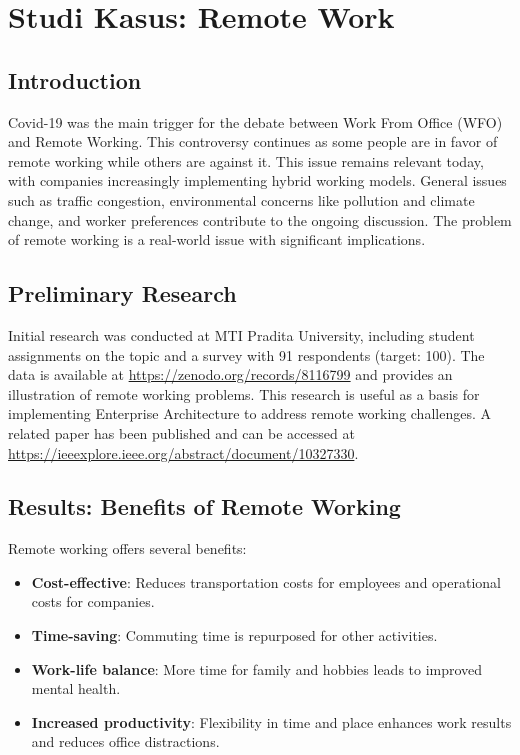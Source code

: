 \chapter{Studi Kasus: Remote Work}

\section{Introduction}

Covid-19 was the main trigger for the debate between Work From Office (WFO) and Remote Working. This controversy continues as some people are in favor of remote working while others are against it. This issue remains relevant today, with companies increasingly implementing hybrid working models. General issues such as traffic congestion, environmental concerns like pollution and climate change, and worker preferences contribute to the ongoing discussion. The problem of remote working is a real-world issue with significant implications.

\section{Preliminary Research}

Initial research was conducted at MTI Pradita University, including student assignments on the topic and a survey with 91 respondents (target: 100). The data is available at \url{https://zenodo.org/records/8116799} and provides an illustration of remote working problems. This research is useful as a basis for implementing Enterprise Architecture to address remote working challenges. A related paper has been published and can be accessed at \url{https://ieeexplore.ieee.org/abstract/document/10327330}.

\section{Results: Benefits of Remote Working}

Remote working offers several benefits:
\begin{itemize}
	\item \textbf{Cost-effective}: Reduces transportation costs for employees and operational costs for companies.
	\item \textbf{Time-saving}: Commuting time is repurposed for other activities.
	\item \textbf{Work-life balance}: More time for family and hobbies leads to improved mental health.
	\item \textbf{Increased productivity}: Flexibility in time and place enhances work results and reduces office distractions.
\end{itemize}


